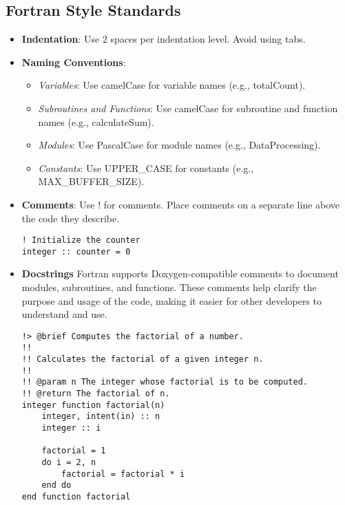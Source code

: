 \documentclass{ol-softwaremanual}
\begin{document}
\subsection{Fortran Style Standards}
\begin{itemize}
\item \textbf{Indentation}:
        Use 2 spaces per indentation level. Avoid using tabs.

\item \textbf{Naming Conventions}:
\begin{itemize}
        \item \textit{Variables}: Use camelCase for variable names (e.g., totalCount).
        \item \textit{Subroutines and Functions}: Use camelCase for subroutine and function names (e.g., calculateSum).
        \item \textit{Modules}: Use PascalCase for module names (e.g., DataProcessing).
        \item \textit{Constants}: Use UPPER\_CASE for constants (e.g., MAX\_BUFFER\_SIZE).
\end{itemize}
    \item \textbf{Comments}:
        Use ! for comments. Place comments on a separate line above the code they describe.

\begin{example}
\begin{verbatim}
! Initialize the counter
integer :: counter = 0
\end{verbatim}
\end{example}

\item \textbf{Docstrings}
Fortran supports Doxygen-compatible comments to document modules, subroutines, and functions. These comments help clarify the purpose and usage of the code, making it easier for other developers to understand and use.
\begin{example}
\begin{verbatim}
!> @brief Computes the factorial of a number.
!! 
!! Calculates the factorial of a given integer n.
!!
!! @param n The integer whose factorial is to be computed.
!! @return The factorial of n.
integer function factorial(n)
    integer, intent(in) :: n
    integer :: i

    factorial = 1
    do i = 2, n
        factorial = factorial * i
    end do
end function factorial
\end{verbatim}
\end{example}


\end{itemize}
\end{document}
